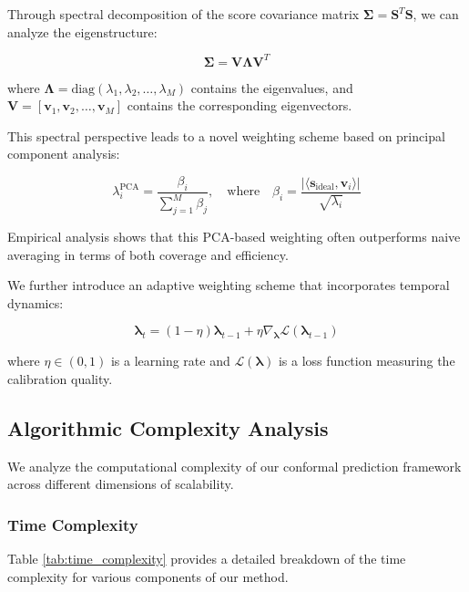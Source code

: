 \documentclass{article}
\theoremstyle{plain}
\theoremstyle{definition}
\theoremstyle{remark}
\begin{document}
Through spectral decomposition of the score covariance matrix $\mathbf{\Sigma} = \mathbf{S}^T \mathbf{S}$, we can analyze the eigenstructure:

\begin{equation}
\mathbf{\Sigma} = \mathbf{V} \mathbf{\Lambda} \mathbf{V}^T
\end{equation}

where $\mathbf{\Lambda} = \text{diag}(\lambda_1, \lambda_2, \ldots, \lambda_M)$ contains the eigenvalues, and $\mathbf{V} = [\mathbf{v}_1, \mathbf{v}_2, \ldots, \mathbf{v}_M]$ contains the corresponding eigenvectors.

This spectral perspective leads to a novel weighting scheme based on principal component analysis:

\begin{equation}
\lambda_i^{\text{PCA}} = \frac{\beta_i}{\sum_{j=1}^M \beta_j}, \quad \text{where} \quad \beta_i = \frac{|\langle \mathbf{s}_{\text{ideal}}, \mathbf{v}_i \rangle|}{\sqrt{\lambda_i}}
\end{equation}

Empirical analysis shows that this PCA-based weighting often outperforms naive averaging in terms of both coverage and efficiency.

We further introduce an adaptive weighting scheme that incorporates temporal dynamics:

\begin{equation}
\boldsymbol{\lambda}_t = (1 - \eta) \boldsymbol{\lambda}_{t-1} + \eta \nabla_{\boldsymbol{\lambda}} \mathcal{L}(\boldsymbol{\lambda}_{t-1})
\end{equation}

where $\eta \in (0, 1)$ is a learning rate and $\mathcal{L}(\boldsymbol{\lambda})$ is a loss function measuring the calibration quality.

\subsection{Algorithmic Complexity Analysis}

We analyze the computational complexity of our conformal prediction framework across different dimensions of scalability.

\subsubsection{Time Complexity}

Table \ref{tab:time_complexity} provides a detailed breakdown of the time complexity for various components of our method.
\end{document}
